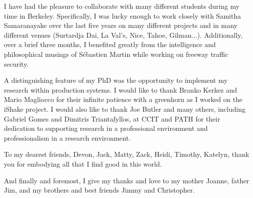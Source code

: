 I have had the pleasure to collaborate with many different students during my time in Berkeley. Specifically, I was lucky enough to work closely with Samitha Samaranayake over the last five years on many different projects and in many different venues (Surtardja Dai, La Val's, Nice, Tahoe, Gilman...). Additionally, over a brief three months, I benefited greatly from the intelligence and philosophical musings of S\'{e}bastien Martin while working on freeway traffic security.

A distinguishing feature of my PhD was the opportunity to implement my research within production systems. I would like to thank Branko Kerkez and Mario Magliocco for their infinite patience with a greenhorn as I worked on the iShake project. I would also like to thank Joe Butler and many others, including Gabriel Gomes and Dimitris Triantafyllos, at CCIT and PATH for their dedication to supporting research in a professional environment and professionalism in a research environment.

To my dearest friends, Devon, Jack, Matty, Zack, Heidi, Timothy, Katelyn, thank you for embodying all that I find good in this world.

And finally and foremost, I give my thanks and love to my mother Joanne, father Jim, and my brothers and best friends Jimmy and Christopher.